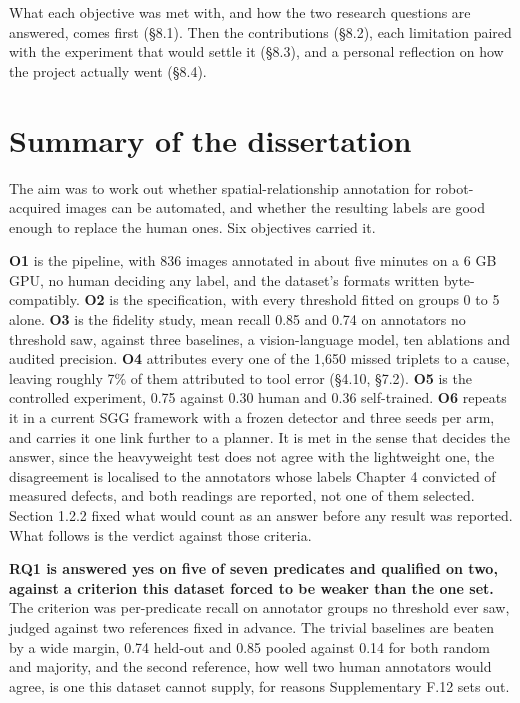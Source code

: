
What each objective was met with, and how the two research questions are answered, comes first (\S{}8.1). Then the contributions (\S{}8.2), each limitation paired with the experiment that would settle it (\S{}8.3), and a personal reflection on how the project actually went (\S{}8.4).

\section{Summary of the dissertation}

The aim was to work out whether spatial-relationship annotation for robot-acquired images can be automated, and whether the resulting labels are good enough to replace the human ones. Six objectives carried it.

\textbf{O1} is the pipeline, with 836 images annotated in about five minutes on a 6 GB GPU, no human deciding any label, and the dataset's formats written byte-compatibly. \textbf{O2} is the specification, with every threshold fitted on groups 0 to 5 alone. \textbf{O3} is the fidelity study, mean recall 0.85 and 0.74 on annotators no threshold saw, against three baselines, a vision-language model, ten ablations and audited precision. \textbf{O4} attributes every one of the 1,650 missed triplets to a cause, leaving roughly 7\% of them attributed to tool error (\S{}4.10, \S{}7.2). \textbf{O5} is the controlled experiment, 0.75 against 0.30 human and 0.36 self-trained. \textbf{O6} repeats it in a current SGG framework with a frozen detector and three seeds per arm, and carries it one link further to a planner. It is met in the sense that decides the answer, since the heavyweight test does not agree with the lightweight one, the disagreement is localised to the annotators whose labels Chapter 4 convicted of measured defects, and both readings are reported, not one of them selected. Section 1.2.2 fixed what would count as an answer before any result was reported. What follows is the verdict against those criteria.

\textbf{RQ1 is answered yes on five of seven predicates and qualified on two, against a criterion this dataset forced to be weaker than the one set.} The criterion was per-predicate recall on annotator groups no threshold ever saw, judged against two references fixed in advance. The trivial baselines are beaten by a wide margin, 0.74 held-out and 0.85 pooled against 0.14 for both random and majority, and the second reference, how well two human annotators would agree, is one this dataset cannot supply, for reasons Supplementary F.12 sets out.

